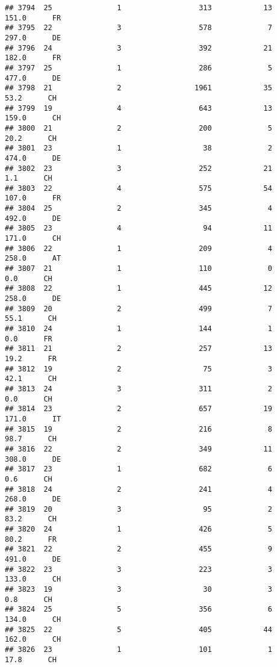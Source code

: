 \documentclass[
]{article}
\begin{document}
\begin{verbatim}
## 3794  25               1                  313            13    151.0      FR
## 3795  22               3                  578             7    297.0      DE
## 3796  24               3                  392            21    182.0      FR
## 3797  25               1                  286             5    477.0      DE
## 3798  21               2                 1961            35     53.2      CH
## 3799  19               4                  643            13    159.0      CH
## 3800  21               2                  200             5     20.2      CH
## 3801  23               1                   38             2    474.0      DE
## 3802  23               3                  252            21      1.1      CH
## 3803  22               4                  575            54    107.0      FR
## 3804  25               2                  345             4    492.0      DE
## 3805  23               4                   94            11    171.0      CH
## 3806  22               1                  209             4    258.0      AT
## 3807  21               1                  110             0      0.0      CH
## 3808  22               1                  445            12    258.0      DE
## 3809  20               2                  499             7     55.1      CH
## 3810  24               1                  144             1      0.0      FR
## 3811  21               2                  257            13     19.2      FR
## 3812  19               2                   75             3     42.1      CH
## 3813  24               3                  311             2      0.0      CH
## 3814  23               2                  657            19    171.0      IT
## 3815  19               2                  216             8     98.7      CH
## 3816  22               2                  349            11    308.0      DE
## 3817  23               1                  682             6      0.6      CH
## 3818  24               2                  241             4    268.0      DE
## 3819  20               3                   95             2     83.2      CH
## 3820  24               1                  426             5     80.2      FR
## 3821  22               2                  455             9    491.0      DE
## 3822  23               3                  223             3    133.0      CH
## 3823  19               3                   30             3      0.8      CH
## 3824  25               5                  356             6    134.0      CH
## 3825  22               5                  405            44    162.0      CH
## 3826  23               1                  101             1     17.8      CH

\end{verbatim}
\end{document}
